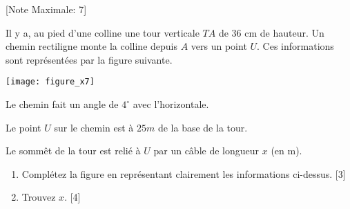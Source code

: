\begin{question}
  \hspace*{\fill} [Note Maximale: 7]\par
  \medskip
  \noindent Il y a, au pied d'une colline une tour verticale $TA$ de 36 cm de hauteur. Un chemin rectiligne monte la colline depuis $A$ vers un point $U$. Ces informations sont représentées par la figure suivante.\par
  \medskip
  \begin{center} %
    \texttt{[image: figure\_x7]}\par
  \end{center} %

  \noindent Le chemin fait un angle de $4^\circ$ avec l'horizontale.\par
  \noindent Le point $U$ sur le chemin est à $25 m$ de la base de la tour.\par
  \noindent Le sommêt de la tour est relié à $U$ par un câble de longueur $x$ (en m).\par
  \begin{enumerate}[label=(\alph*)]
    \item Complétez la figure en représentant clairement les informations ci-dessus.\hspace*{\fill} [3]
    \item Trouvez $x$.\hspace*{\fill} [4]
  \end{enumerate}
\end{question}
